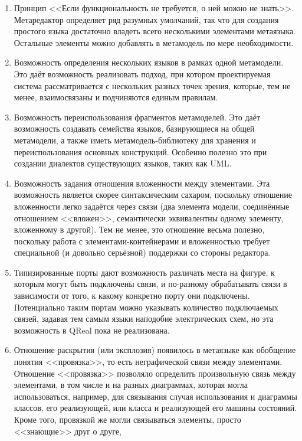 \begin{enumerate}
	\item Принцип <<Если функциональность не требуется, о ней можно не знать>>. Метаредактор 
		определяет ряд разумных умолчаний, так что для создания простого языка достаточно 
		владеть всего несколькими элементами метаязыка. Остальные элементы можно добавлять 
		в метамодель по мере необходимости.
	\item Возможность определения нескольких языков в рамках одной метамодели. Это даёт 
		возможность реализовать подход, при котором проектируемая система рассматривается 
		с нескольких разных точек зрения, которые, тем не менее, взаимосвязаны и подчиняются 
		единым правилам.
	\item Возможность переиспользования фрагментов метамоделей. Это даёт возможность 
		создавать семейства языков, базирующиеся на общей метамодели, а также иметь метамодель-библиотеку 
		для хранения и переиспользования основных конструкций. Особенно полезно это при 
		создании диалектов существующих языков, таких как UML.
	\item Возможность задания отношения вложенности между элементами. Эта возможность 
		является скорее синтаксическим сахаром, поскольку отношение вложенности легко 
		задаётся через связи (два элемента модели, соединённые отношением <<вложен>>, 
		семантически эквивалентны одному элементу, вложенному в другой). Тем не менее, 
		это отношение весьма полезно, поскольку работа с элементами-контейнерами и вложенностью 
		требует специальной (и довольно серьёзной) поддержки со стороны редактора.
	\item Типизированные порты дают возможность различать места на фигуре, к которым 
		могут быть подключены связи, и по-разному обрабатывать связи в зависимости от 
		того, к какому конкретно порту они подключены. Потенциально таким портам можно 
		указывать количество подключаемых связей, задавая тем самым языки наподобие электрических 
		схем, но эта возможность в QReal пока не реализована.
	\item Отношение раскрытия (или эксплозия) появилось в метаязыке как обобщение понятия 
		<<провязка>>, то есть неграфической связи между элементами. Отношение <<провязка>> 
		позволяло определить произвольную связь между элементами, в том числе и на разных 
		диаграммах, которая могла использоваться, например, для связывания случая использования 
		и диаграммы классов, его реализующей, или класса и реализующей его машины состояний. 
		Кроме того, провязкой же могли связываться элементы, просто <<знающие>> друг о друге, 

\end{enumerate}

